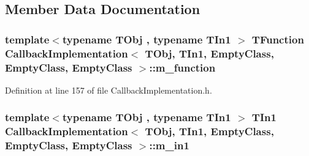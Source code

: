 \subsection{Member Data Documentation}
\hypertarget{class_callback_implementation_3_01_t_obj_00_01_t_in1_00_01_empty_class_00_01_empty_class_00_01_empty_class_01_4_ab15e5d7c385ca2c7958e32f43f14b1f3}{
\subsubsection[{m\-\_\-function}]{\setlength{\rightskip}{0pt plus 5cm}template$<$typename T\-Obj , typename T\-In1 $>$ {\bf T\-Function} {\bf Callback\-Implementation}$<$ T\-Obj, T\-In1, {\bf Empty\-Class}, {\bf Empty\-Class}, {\bf Empty\-Class} $>$\-::m\-\_\-function\hspace{0.3cm}{\ttfamily [private]}}}\label{class_callback_implementation_3_01_t_obj_00_01_t_in1_00_01_empty_class_00_01_empty_class_00_01_empty_class_01_4_ab15e5d7c385ca2c7958e32f43f14b1f3}


Definition at line 157 of file Callback\-Implementation.\-h.

\hypertarget{class_callback_implementation_3_01_t_obj_00_01_t_in1_00_01_empty_class_00_01_empty_class_00_01_empty_class_01_4_adfb4f5b52516f5c78c02c6bb7288656a}{
\subsubsection[{m\-\_\-in1}]{\setlength{\rightskip}{0pt plus 5cm}template$<$typename T\-Obj , typename T\-In1 $>$ T\-In1 {\bf Callback\-Implementation}$<$ T\-Obj, T\-In1, {\bf Empty\-Class}, {\bf Empty\-Class}, {\bf Empty\-Class} $>$\-::m\-\_\-in1\hspace{0.3cm}{\ttfamily [private]}}}\label{class_callback_implementation_3_01_t_obj_00_01_t_in1_00_01_empty_class_00_01_empty_class_00_01_empty_class_01_4_adfb4f5b52516f5c78c02c6bb7288656a}


